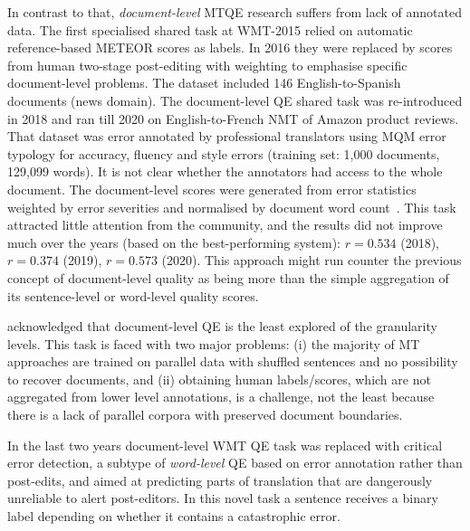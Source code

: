 In contrast to that, \textit{document-level} MTQE research suffers from lack of annotated data. The first specialised shared task at WMT-2015 relied on automatic reference-based \gls{METEOR} scores as labels. In 2016 they were replaced by scores from human two-stage post-editing with weighting to emphasise specific document-level problems. 
The dataset included 146 English-to-Spanish documents (news domain).
The document-level QE shared task was re-introduced in 2018 and ran till 2020 on English-to-French NMT of Amazon product reviews. That dataset was error annotated by professional translators using \gls{MQM} error typology for accuracy, fluency and style errors (training set: 1,000 documents, 129,099 words). It is not clear whether the annotators had access to the whole document. The document-level scores were generated from error statistics weighted by error severities and normalised by document word count~\cite{Specia2018wmt}. This task attracted little attention from the community, and the results did not improve much over the years (based on the best-performing system): $r=0.534$ (2018), $r=0.374$ (2019), $r=0.573$ (2020). 
This approach might run counter the previous concept of document-level quality as being more than the simple aggregation of its sentence-level or word-level quality scores. 

\citet{Specia2018a} acknowledged that document-level QE is the least explored of the granularity levels. This task is faced with two major problems: (i) the majority of MT approaches are trained on parallel data with shuffled sentences and no possibility to recover documents, and (ii) obtaining human labels/scores, which are not aggregated from lower level annotations, is a challenge, not the least because there is a lack of parallel corpora with preserved document boundaries. 

In the last two years document-level WMT QE task was replaced with critical error detection, a subtype of \textit{word-level} QE based on error annotation rather than post-edits, and aimed at predicting parts of translation that are dangerously unreliable to alert post-editors. In this novel task a sentence receives a binary label depending on whether it contains a catastrophic error. 
\label{pg:eval_setup}
